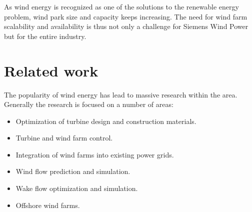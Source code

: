 
As wind energy is recognized as one of the solutions to the renewable energy problem, wind park size and capacity keeps increasing.
The need for wind farm scalability and availability is thus not only a challenge for Siemens Wind Power but for the entire industry.

\section{Related work}
The popularity of wind energy has lead to massive research within the area. Generally the research is focused on a number of areas:

\begin{itemize}
	\item Optimization of turbine design and construction materials.
	\item Turbine and wind farm control.
	\item Integration of wind farms into existing power grids.
	\item Wind flow prediction and simulation.
	\item Wake flow optimization and simulation.
	\item Offshore wind farms.
\end{itemize}

%

